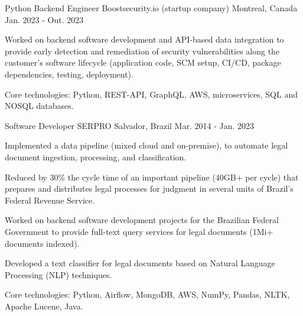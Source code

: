 


\begin{cventries}


\cventry
{Python Backend Engineer} %
{Boostsecurity.io (startup company)} %
{Montreal, Canada} %
{Jan. 2023 - Out. 2023} %
{ %
\begin{cvitems}
	\item {Worked on backend software development and API-based data integration to provide early detection and remediation of security vulnerabilities along the customer's software lifecycle (application code, SCM setup, CI/CD, package dependencies, testing, deployment).}
	\item{Core technologies: Python, REST-API, GraphQL, AWS, microservices, SQL and NOSQL databases.}
\end{cvitems}
}


\cventry
{Software Developer} %
{SERPRO} %
{Salvador, Brazil} %
{Mar. 2014 - Jan. 2023} %
{ %
\begin{cvitems}
	\item{Implemented a data pipeline (mixed cloud and on-premise), to automate legal document ingestion, processing, and classification.}
	\item{Reduced by 30\% the cycle time of an important pipeline (40GB+ per cycle) that prepares and distributes legal processes for judgment in several units of Brazil’s Federal Revenue Service.}
	\item{Worked on backend software development projects for the Brazilian Federal Government to provide full-text query services for legal documents (1Mi+ documents indexed).}
	\item{Developed a text classifier for legal documents based on Natural Language Processing (NLP) techniques.}
	\item{Core technologies: Python, Airflow, MongoDB, AWS, NumPy, Pandas, NLTK, Apache Lucene, Java.}
\end{cvitems}
}


\end{cventries}
